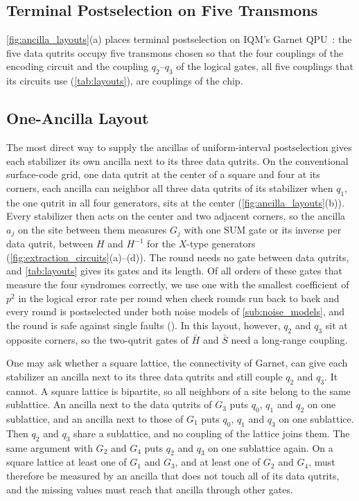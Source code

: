 \subsection{Terminal Postselection on Five Transmons}
\label{sub:layout_terminal}

\autoref{fig:ancilla_layouts}(a) places terminal postselection on IQM's Garnet QPU~\cite{IQM240812433}: the five data qutrits occupy five transmons chosen so that the four couplings of the encoding circuit and the coupling $q_2$--$q_3$ of the logical gates, all five couplings that its circuits use (\autoref{tab:layouts}), are couplings of the chip.

\subsection{One-Ancilla Layout}
\label{sub:layout_one}

The most direct way to supply the ancillas of uniform-interval postselection gives each stabilizer its own ancilla next to its three data qutrits. On the conventional surface-code grid, one data qutrit at the center of a square and four at its corners, each ancilla can neighbor all three data qutrits of its stabilizer when $q_1$, the one qutrit in all four generators, sits at the center (\autoref{fig:ancilla_layouts}(b)). Every stabilizer then acts on the center and two adjacent corners, so the ancilla $a_j$ on the site between them measures $G_j$ with one SUM gate or its inverse per data qutrit, between $H$ and $H^{-1}$ for the $X$-type generators (\autoref{fig:extraction_circuits}(a)--(d)). The round needs no gate between data qutrits, and \autoref{tab:layouts} gives its gates and its length. Of all orders of these gates that measure the four syndromes correctly, we use one with the smallest coefficient of $p^2$ in the logical error rate per round when check rounds run back to back and every round is postselected under both noise models of \autoref{sub:noise_models}, and the round is safe against single faults (). In this layout, however, $q_2$ and $q_3$ sit at opposite corners, so the two-qutrit gates of $\bar H$ and $\bar S$ need a long-range coupling.

One may ask whether a square lattice, the connectivity of Garnet, can give each stabilizer an ancilla next to its three data qutrits and still couple $q_2$ and $q_3$. It cannot. A square lattice is bipartite, so all neighbors of a site belong to the same sublattice. An ancilla next to the data qutrits of $G_3$ puts $q_0$, $q_1$ and $q_2$ on one sublattice, and an ancilla next to those of $G_1$ puts $q_0$, $q_1$ and $q_3$ on one sublattice. Then $q_2$ and $q_3$ share a sublattice, and no coupling of the lattice joins them. The same argument with $G_2$ and $G_4$ puts $q_2$ and $q_3$ on one sublattice again. On a square lattice at least one of $G_1$ and $G_3$, and at least one of $G_2$ and $G_4$, must therefore be measured by an ancilla that does not touch all of its data qutrits, and the missing values must reach that ancilla through other gates.

